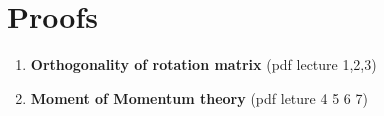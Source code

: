 \section{Proofs}
\label{appendix: proofs}
\begin{enumerate}
    \item \textbf{Orthogonality of rotation matrix} (pdf lecture 1,2,3)
    \item \textbf{Moment of Momentum theory} (pdf leture 4 5 6 7)
\end{enumerate}